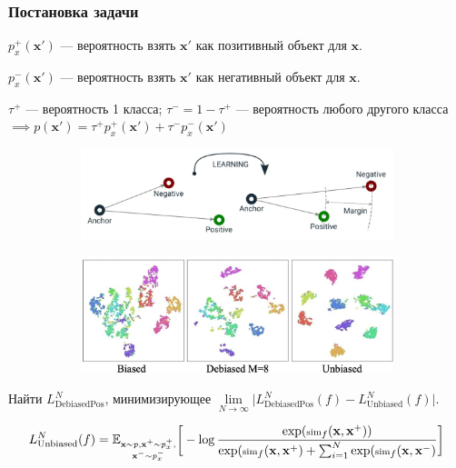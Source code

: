 \documentclass[
	11pt, %
]{beamer}
\begin{document}
\begin{frame}
    \frametitle{Постановка задачи}
\small
$p^+_x(\mathbf{x'})$ — вероятность взять $\mathbf{x'}$ как позитивный объект для $\mathbf{x}$.

$p^-_x(\mathbf{x'})$ — вероятность взять $\mathbf{x'}$ как негативный объект для $\mathbf{x}$.

$\tau^+$ — вероятность 1 класса; $\tau^- = 1 - \tau^+$ — вероятность любого другого класса $\implies p(\mathbf{x'}) = \tau^+ p_x^+(\mathbf{x'}) + \tau^-p_x^-(\mathbf{x'})$

\begin{figure}
\centering
\begin{subfigure}
  \centering
  \includegraphics[width=.4\linewidth]{Images/triplet.jpeg}
  \label{fig:sub1}
\end{subfigure}%
\begin{subfigure}
  \centering
  \includegraphics[width=.5\linewidth]{Images/t-SNE.jpeg}
  \label{fig:sub2}
\end{subfigure}
\label{fig:test}
\end{figure}

Найти $L_{\text{DebiasedPos}}^N$, минимизирующее $\lim \limits_{N \to \infty} \big|L_{\text{DebiasedPos}}^N (f)  - L_{\text{Unbiased}}^N(f)\big|$.

\begin{equation*} \small
L_{\text{Unbiased}}^N(f) = \mathbb{E}_{\substack{\mathbf{x} \sim p, \mathbf{x^+} \sim p^+_x,\\ \mathbf{x^-} \sim p_x^-}} \bigg[-\log \frac{\exp (\scriptsize\text{sim}_f(\mathbf{x}, \mathbf{x^+}))}{\exp (\scriptsize\text{sim}_f(\mathbf{x}, \mathbf{x^+}) + \sum _{i=1}^N \exp (\scriptsize\text{sim}_f(\mathbf{x}, \mathbf{x^-})}\bigg]
\end{equation*}

\end{frame}
\end{document}
